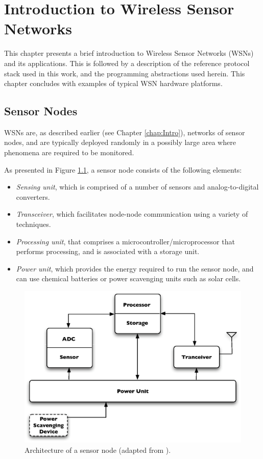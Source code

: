 \chapter{Introduction to Wireless Sensor Networks} \label{chap:IntroWSN}
This chapter presents a brief introduction to Wireless Sensor Networks (WSNs)
and its applications. This is followed by a description of the reference
protocol stack used in this work, and the programming abstractions used herein. 
This chapter concludes with examples of typical WSN hardware platforms.

\section{Sensor Nodes} \label{subsec:sensornodes}
WSNs are, as described earlier (see Chapter \ref{chap:Intro}), networks of sensor
nodes, and are typically deployed randomly in a possibly large area where
phenomena are required to be monitored.

As presented in Figure \ref{Fig:SensorNodeArch}, a sensor node consists of
the following elements:
\begin{itemize}
  \item \emph{Sensing unit}, which is comprised of a number of sensors and
  analog-to-digital converters. 
  \item \emph{Transceiver}, which facilitates node-node communication using 
a variety of techniques.
  \item \emph{Processing unit}, that comprises a 
microcontroller/microprocessor that performs processing, and is associated with 
a storage unit.
  \item \emph{Power unit}, which provides the energy required to run the sensor node, and can use chemical 
batteries or power scavenging units such as solar cells.
\end{itemize}

\begin{figure}[h]
\centering
\includegraphics[scale=0.65]{img/SensorNodeArch.eps} 
\caption[Architecture of a sensor node] {Architecture of a sensor node (adapted from \cite{SensorSurveyAkyildiz:2002}).}
\label{Fig:SensorNodeArch}
\end{figure} 

